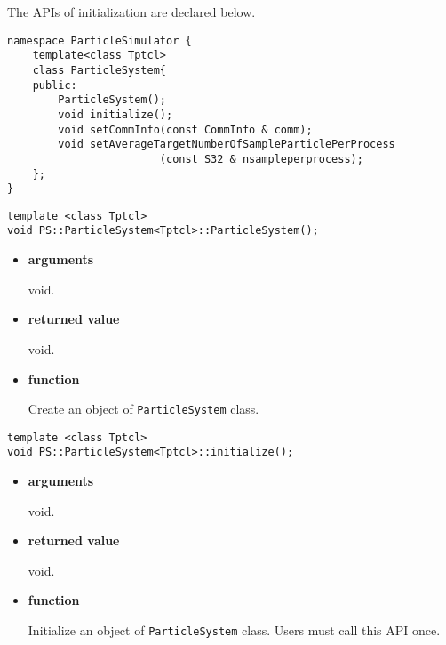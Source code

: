 The APIs of initialization are declared below.

\begin{lstlisting}[caption=ParticleSystem1]
namespace ParticleSimulator {
    template<class Tptcl>
    class ParticleSystem{
    public:
        ParticleSystem();
        void initialize();
        void setCommInfo(const CommInfo & comm);
        void setAverageTargetNumberOfSampleParticlePerProcess
                        (const S32 & nsampleperprocess);
    };
}
\end{lstlisting}



\begin{screen}
\begin{verbatim}
template <class Tptcl>
void PS::ParticleSystem<Tptcl>::ParticleSystem();
\end{verbatim}
\end{screen}

\begin{itemize}

\item {\bf arguments}

void.

\item {\bf returned value}

void.

\item {\bf function}

Create an object of {\tt ParticleSystem} class.

\end{itemize}


\begin{screen}
\begin{verbatim}
template <class Tptcl> 
void PS::ParticleSystem<Tptcl>::initialize();
\end{verbatim}
\end{screen}

\begin{itemize}

\item {\bf arguments}

void.

\item {\bf returned value}

void.

\item {\bf function}

Initialize an object of {\tt ParticleSystem} class. Users must call
this API once.


\end{itemize}


